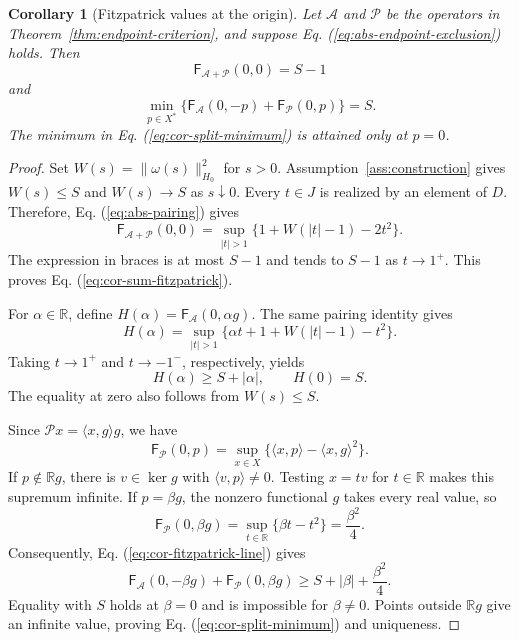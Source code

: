 \documentclass[11pt]{article}
\newcommand{\R}{\mathbb R}
\newcommand{\pair}[2]{\langle #1,#2\rangle}
\newtheorem{corollary}{Corollary}
\theoremstyle{definition}
\theoremstyle{remark}
\begin{document}
\begin{corollary}[Fitzpatrick values at the origin]
\label{cor:fitzpatrick-values}
Let $\mathcal A$ and $\mathcal P$ be the operators in Theorem~\ref{thm:endpoint-criterion}, and suppose Eq. (\ref{eq:abs-endpoint-exclusion}) holds. Then
\begin{equation}
\mathsf F_{\mathcal A+\mathcal P}(0,0)=S-1
\label{eq:cor-sum-fitzpatrick}
\end{equation}
and
\begin{equation}
\min_{p\in X^*}
\{\mathsf F_{\mathcal A}(0,-p)+\mathsf F_{\mathcal P}(0,p)\}=S.
\label{eq:cor-split-minimum}
\end{equation}
The minimum in Eq. (\ref{eq:cor-split-minimum}) is attained only at $p=0$.
\end{corollary}
\begin{proof}
Set $W(s)=\|\omega(s)\|_{H_0}^2$ for $s>0$. Assumption~\ref{ass:construction} gives $W(s)\le S$ and $W(s)\to S$ as $s\downarrow0$. Every $t\in J$ is realized by an element of $D$. Therefore, Eq. (\ref{eq:abs-pairing}) gives
\[
\mathsf F_{\mathcal A+\mathcal P}(0,0)
=\sup_{|t|>1}\{1+W(|t|-1)-2t^2\}.
\]
The expression in braces is at most $S-1$ and tends to $S-1$ as $t\to1^+$. This proves Eq. (\ref{eq:cor-sum-fitzpatrick}).

For $\alpha\in\R$, define $H(\alpha)=\mathsf F_{\mathcal A}(0,\alpha g)$. The same pairing identity gives
\[
H(\alpha)=\sup_{|t|>1}
\{\alpha t+1+W(|t|-1)-t^2\}.
\]
Taking $t\to1^+$ and $t\to-1^-$, respectively, yields
\begin{equation}
H(\alpha)\ge S+|\alpha|,
\qquad H(0)=S.
\label{eq:cor-fitzpatrick-line}
\end{equation}
The equality at zero also follows from $W(s)\le S$.

Since $\mathcal P x=\pair{x}{g}g$, we have
\[
\mathsf F_{\mathcal P}(0,p)
=\sup_{x\in X}\{\pair{x}{p}-\pair{x}{g}^2\}.
\]
If $p\notin\R g$, there is $v\in\ker g$ with $\pair{v}{p}\ne0$. Testing $x=tv$ for $t\in\R$ makes this supremum infinite. If $p=\beta g$, the nonzero functional $g$ takes every real value, so
\[
\mathsf F_{\mathcal P}(0,\beta g)
=\sup_{t\in\R}\{\beta t-t^2\}
=\frac{\beta^2}{4}.
\]
Consequently, Eq. (\ref{eq:cor-fitzpatrick-line}) gives
\[
\mathsf F_{\mathcal A}(0,-\beta g)
+\mathsf F_{\mathcal P}(0,\beta g)
\ge S+|\beta|+\frac{\beta^2}{4}.
\]
Equality with $S$ holds at $\beta=0$ and is impossible for $\beta\ne0$. Points outside $\R g$ give an infinite value, proving Eq. (\ref{eq:cor-split-minimum}) and uniqueness.
\end{proof}
\end{document}
